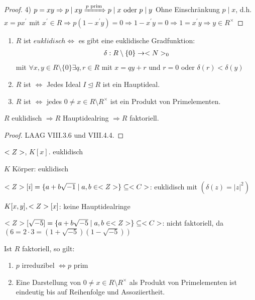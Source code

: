 \begin{proof}
	4) $p = xy \Rightarrow p \mid xy \xRightarrow{p \text{ prim}} p \mid x \text{ oder } p\mid y$ Ohne Einschränkung $p \mid x$, d.h. $x = px^{'}$ mit $x^{'} \in R \Rightarrow p(1-x^{'}y) =0 \Rightarrow 1 - x^{'}y = 0 \Rightarrow 1 = x^{'}y \Rightarrow y \in R^{\times}$
\end{proof}

\begin{definition}
	\begin{enumerate}
		\item $R$ ist $euklidisch \Leftrightarrow$ es gibt eine euklidische Gradfunktion:
		\begin{align}
			\delta: R\setminus \{0\} \to <N>_0 \notag
		\end{align}
		mit $\forall x,y \in R\setminus \{0\} \exists q,r \in R$ mit $x = qy + r$ und $r=0$ oder $\delta(r) < \delta(y)$
		\item $R$ ist  $\Leftrightarrow$ Jedes Ideal $I \unlhd R$ ist ein Hauptideal.
		\item $R$ ist  $\Leftrightarrow$ jedes $0 \neq x \in R\setminus R^{\times}$ ist ein Produkt von Primelementen.
	\end{enumerate}
\end{definition}

\begin{proposition}
	$R$ euklidisch $\Rightarrow R$ Hauptidealring $\Rightarrow R$ faktoriell.
\end{proposition}

\begin{proof}
	LAAG VIII.3.6 und VIII.4.4.
\end{proof}

\begin{example}
	\item $<Z>$, $K[x]$. euklidisch
	\item $K$ Körper: euklidisch
	\item $<Z>[i] = \{ a+b\sqrt{-1} \mid a,b \in <Z> \} \subseteq <C>$: euklidisch mit $(\delta(z) = \vert z \vert^2)$
	\item $K[x,y], <Z>[x]$: keine Hauptidealringe
	\item $<Z>[\sqrt{-5}] = \{ a+b\sqrt{-5} \mid a,b \in <Z> \} \subseteq <C>$: nicht faktoriell, da $(6 = 2\cdot 3 = (1 + \sqrt{-5})(1-\sqrt{-5}))$
\end{example}

\begin{remark}
	Ist $R$ faktoriell, so gilt:
	\begin{enumerate}
		\item $p$ irreduzibel $\Leftrightarrow p$ prim
		\item Eine Darstellung von $0 \neq x \in R \setminus R^{\times}$ als Produkt von Primelementen ist eindeutig bis auf Reihenfolge und Assoziiertheit.
	\end{enumerate}
\end{remark}

